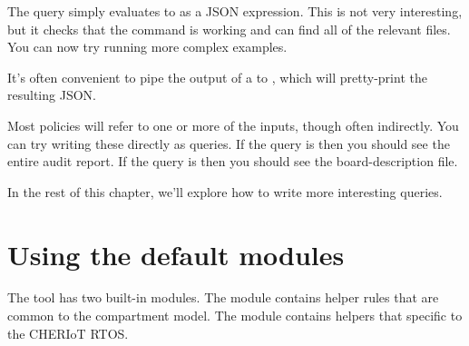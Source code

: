
The query  simply evaluates to  as a JSON expression.
This is not very interesting, but it checks that the command is working and can find all of the relevant files.
You can now try running more complex examples.

\begin{note}
	It's often convenient to pipe the output of a  to , which will pretty-print the resulting JSON.
\end{note}

Most policies will refer to one or more of the inputs, though often indirectly.
You can try writing these directly as queries.
If the query is  then you should see the entire audit report.
If the query is  then you should see the board-description file.

In the rest of this chapter, we'll explore how to write more interesting queries.

\section{Using the default  modules}

The  tool has two built-in modules.
The  module contains helper rules that are common to the compartment model.
The  module contains helpers that specific to the CHERIoT RTOS.

